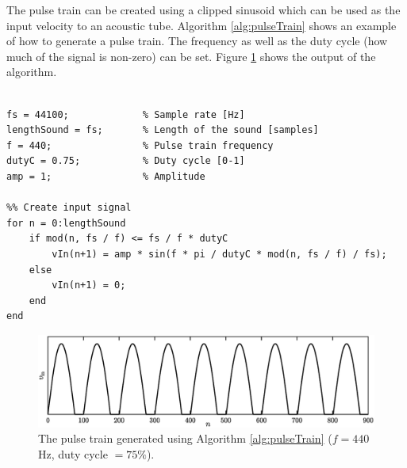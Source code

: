 The pulse train can be created using a clipped sinusoid which can be used as the input velocity to an acoustic tube. Algorithm \ref{alg:pulseTrain} shows an example of how to generate a pulse train. The frequency as well as the duty cycle (how much of the signal is non-zero) can be set. Figure \ref{fig:pulseTrain} shows the output of the algorithm.
\begin{minipage}{\textwidth}
\setlstMAT
\begin{lstlisting}[caption={\texttt{MATLAB} code to generate a pulse train}, label=alg:pulseTrain]
%% Pulse train generator

fs = 44100;             % Sample rate [Hz]
lengthSound = fs;       % Length of the sound [samples]
f = 440;                % Pulse train frequency
dutyC = 0.75;           % Duty cycle [0-1]
amp = 1;                % Amplitude

%% Create input signal
for n = 0:lengthSound
    if mod(n, fs / f) <= fs / f * dutyC
        vIn(n+1) = amp * sin(f * pi / dutyC * mod(n, fs / f) / fs);
    else
        vIn(n+1) = 0;
    end
end
\end{lstlisting}
\end{minipage}

\begin{figure}[h]
    \centering
    \includegraphics[width=\textwidth]{figures/exciters/physInsp/pulseTrain.eps}
    \caption{The pulse train generated using Algorithm \ref{alg:pulseTrain} ($f = 440$ Hz, duty cycle $ = 75\%$).
    \label{fig:pulseTrain}}
\end{figure}